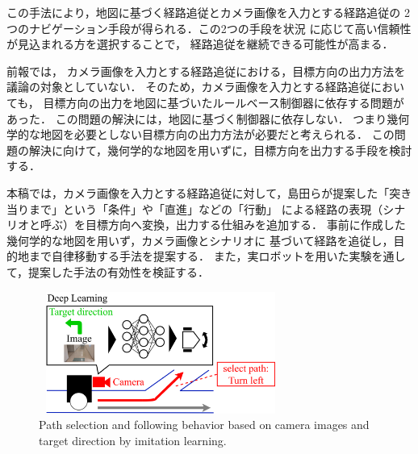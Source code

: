 \documentclass{sice-si}
\begin{document}
この手法により，地図に基づく経路追従とカメラ画像を入力とする経路追従の
2つのナビゲーション手段が得られる．この2つの手段を状況
に応じて高い信頼性が見込まれる方を選択することで，
経路追従を継続できる可能性が高まる．\par
前報では\cite{haruyama2022}\cite{fujiwara2023}，
カメラ画像を入力とする経路追従における，目標方向の出力方法を
議論の対象としていない．
そのため，カメラ画像を入力とする経路追従においても，
目標方向の出力を地図に基づいたルールベース制御器に依存する問題があった．
この問題の解決には，地図に基づく制御器に依存しない．
つまり幾何学的な地図を必要としない目標方向の出力方法が必要だと考えられる．
この問題の解決に向けて，幾何学的な地図を用いずに，目標方向を出力する手段を検討する．
\cite{shimada2020}
\par
本稿では，カメラ画像を入力とする経路追従に対して，島田らが提案した「突き当りまで」という「条件」や「直進」などの「行動」
による経路の表現（シナリオと呼ぶ）\cite{shimada2020}を目標方向へ変換，出力する仕組みを追加する．
事前に作成した幾何学的な地図を用いず，カメラ画像とシナリオに
基づいて経路を追従し，目的地まで自律移動する手法を提案する．
また，実ロボットを用いた実験を通して，提案した手法の有効性を検証する．
\begin{figure}[h!]
    \centering
     \includegraphics[height=40mm,width=80mm]{./figs/camera_base.png}
     \caption{Path selection and following behavior based on camera images and
     target direction by imitation learning.}\label{fig:camera_base}
\end{figure}
\end{document}
